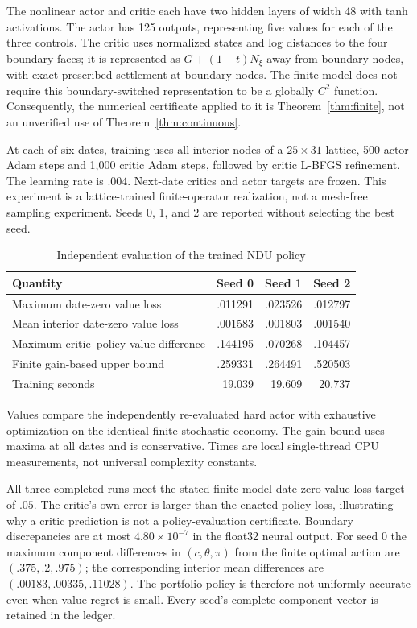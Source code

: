 The nonlinear actor and critic each have two hidden layers of width 48 with tanh activations. The actor has 125 outputs, representing five values for each of the three controls. The critic uses normalized states and log distances to the four boundary faces; it is represented as $G+(1-t)N_\xi$ away from boundary nodes, with exact prescribed settlement at boundary nodes. The finite model does not require this boundary-switched representation to be a globally $C^2$ function. Consequently, the numerical certificate applied to it is Theorem~\ref{thm:finite}, not an unverified use of Theorem~\ref{thm:continuous}.

At each of six dates, training uses all interior nodes of a $25\times31$ lattice, 500 actor Adam steps and 1,000 critic Adam steps, followed by critic L-BFGS refinement. The learning rate is $.004$. Next-date critics and actor targets are frozen. This experiment is a lattice-trained finite-operator realization, not a mesh-free sampling experiment. Seeds 0, 1, and 2 are reported without selecting the best seed.

\begin{table}[ht]
\centering
\caption{Independent evaluation of the trained NDU policy}
\label{tab:neural}
\begin{tabular}{lrrr}
\toprule
Quantity & Seed 0 & Seed 1 & Seed 2\\
\midrule
Maximum date-zero value loss & .011291 & .023526 & .012797\\
Mean interior date-zero value loss & .001583 & .001803 & .001540\\
Maximum critic--policy value difference & .144195 & .070268 & .104457\\
Finite gain-based upper bound & .259331 & .264491 & .520503\\
Training seconds & 19.039 & 19.609 & 20.737\\
\bottomrule
\end{tabular}
\par\smallskip\footnotesize Values compare the independently re-evaluated hard actor with exhaustive optimization on the identical finite stochastic economy. The gain bound uses maxima at all dates and is conservative. Times are local single-thread CPU measurements, not universal complexity constants.
\end{table}

All three completed runs meet the stated finite-model date-zero value-loss target of $.05$. The critic's own error is larger than the enacted policy loss, illustrating why a critic prediction is not a policy-evaluation certificate. Boundary discrepancies are at most $4.80\times10^{-7}$ in the float32 neural output. For seed 0 the maximum component differences in $(c,\theta,\pi)$ from the finite optimal action are $(.375,.2,.975)$; the corresponding interior mean differences are $(.00183,.00335,.11028)$. The portfolio policy is therefore not uniformly accurate even when value regret is small. Every seed's complete component vector is retained in the ledger.

